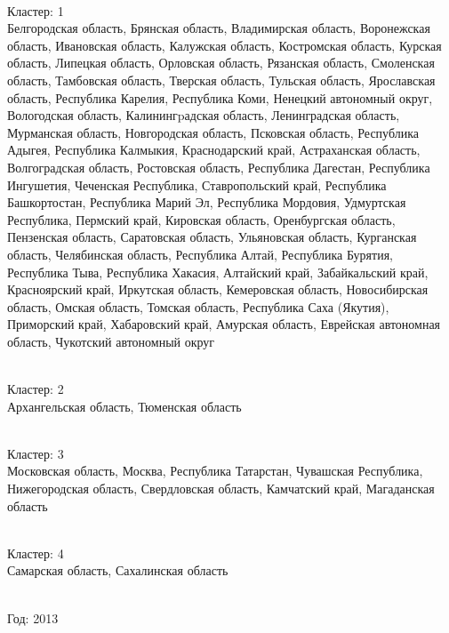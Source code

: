 \documentclass[11pt]{article}
\begin{document}
\newline \\ Кластер:  1
\\ Белгородская область, Брянская область, Владимирская область, Воронежская область, Ивановская область, Калужская область, Костромская область, Курская область, Липецкая область, Орловская область, Рязанская область, Смоленская область, Тамбовская область, Тверская область, Тульская область, Ярославская область, Республика Карелия, Республика Коми, Ненецкий автономный округ, Вологодская область, Калинингpадская область, Ленинградская область, Мурманская область, Новгородская область, Псковская область, Республика Адыгея, Республика Калмыкия, Краснодарский край, Астраханская область, Волгоградская область, Ростовская область, Республика Дагестан, Республика Ингушетия, Чеченская Республика, Ставропольский край, Республика Башкортостан, Республика Марий Эл, Республика Мордовия, Удмуртская Республика, Пермский край, Кировская область, Оренбургская область, Пензенская область, Саратовская область, Ульяновская область, Курганская область, Челябинская область, Республика Алтай, Республика Бурятия, Республика Тыва, Республика Хакасия, Алтайский край, Забайкальский край, Красноярский край, Иркутская область, Кемеровская область, Новосибирская область, Омская область, Томская область, Республика Саха (Якутия), Приморский край, Хабаровский край, Амурская область, Еврейская автономная область, Чукотский автономный округ

\newline \\ Кластер:  2
\\ Архангельская область, Тюменская область

\newline \\ Кластер:  3
\\ Московская область, Москва, Республика Татарстан, Чувашская Республика, Нижегородская область, Свердловская область, Камчатский край, Магаданская область

\newline \\ Кластер:  4
\\ Самарская область, Сахалинская область


\newline \newline \\ Год:  2013
\end{document}
